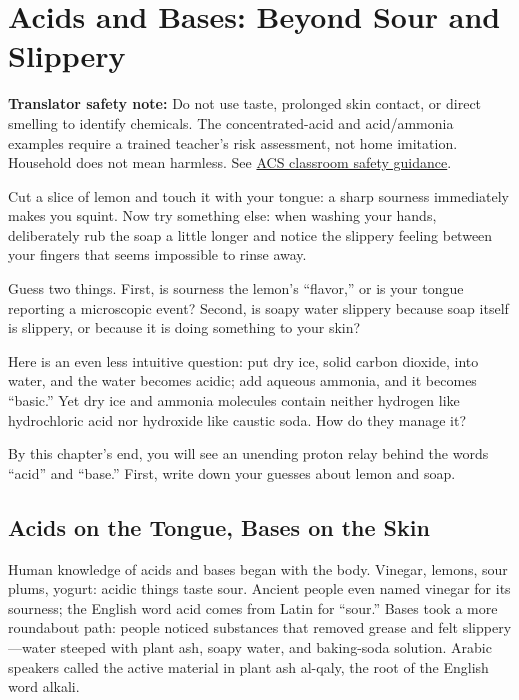 \chapter{Acids and Bases: Beyond Sour and Slippery}

\begin{kaichang}
\textbf{Translator safety note:} Do not use taste, prolonged skin contact, or direct smelling to identify chemicals. The concentrated-acid and acid/ammonia examples require a trained teacher's risk assessment, not home imitation. Household does not mean harmless. See \href{https://www.acs.org/content/dam/acsorg/about/governance/committees/chemicalsafety/safetypractices/safety-in-the-elementary-school-science-classroom.pdf}{ACS classroom safety guidance}.

Cut a slice of lemon and touch it with your tongue: a sharp sourness immediately makes you squint. Now try something else: when washing your hands, deliberately rub the soap a little longer and notice the slippery feeling between your fingers that seems impossible to rinse away.

Guess two things. First, is sourness the lemon's ``flavor,'' or is your tongue reporting a microscopic event? Second, is soapy water slippery because soap itself is slippery, or because it is doing something to your skin?

Here is an even less intuitive question: put dry ice, solid carbon dioxide, into water, and the water becomes acidic; add aqueous ammonia, and it becomes ``basic.'' Yet dry ice and ammonia molecules contain neither hydrogen like hydrochloric acid nor hydroxide like caustic soda. How do they manage it?

By this chapter's end, you will see an unending proton relay behind the words ``acid'' and ``base.'' First, write down your guesses about lemon and soap.
\end{kaichang}

\section{Acids on the Tongue, Bases on the Skin}

Human knowledge of acids and bases began with the body. Vinegar, lemons, sour plums, yogurt: acidic things taste sour. Ancient people even named vinegar for its sourness; the English word acid comes from Latin for ``sour.'' Bases took a more roundabout path: people noticed substances that removed grease and felt slippery---water steeped with plant ash, soapy water, and baking-soda solution. Arabic speakers called the active material in plant ash al-qaly, the root of the English word alkali.

